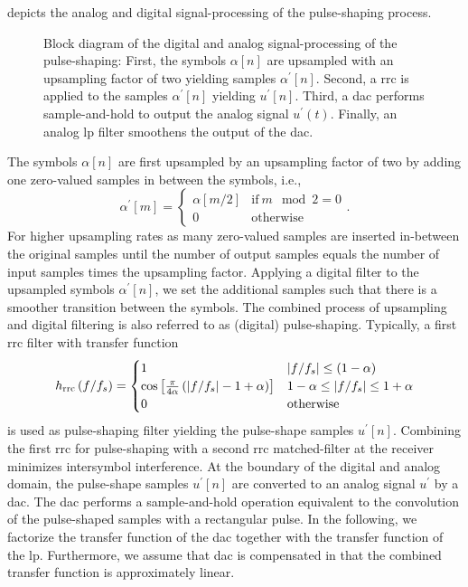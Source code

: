  depicts the analog and digital signal-processing of the pulse-shaping process.
\begin{figure}[htb]
	\centering
	
	\caption{Block diagram of the digital and analog signal-processing of the pulse-shaping: First, the symbols $\alpha[n]$ are upsampled with an upsampling factor of two yielding samples $\alpha^\prime[n]$. Second, a \gls{rrc} is applied to the samples $\alpha^\prime[n]$ yielding $u^\prime[n]$. Third, a \gls{dac} performs sample-and-hold to output the analog signal $u^\prime(t)$. Finally, an analog \gls{lp} filter smoothens the output of the \gls{dac}.}\label{fig:pulse_shaping_block}
\end{figure}
The symbols $\alpha[n]$ are first upsampled by an upsampling factor of two by adding one zero-valued samples in between the symbols, i.e.,
\begin{equation}
	\alpha^\prime[m]
	=
	\begin{cases}
		\alpha[m/2] & \text{if}\ m\mod2=0 \\
		0 & \text{otherwise}
	\end{cases}
	.
\end{equation}
For higher upsampling rates as many zero-valued samples are inserted in-between the original samples until the number of output samples equals the number of input samples times the upsampling factor.
Applying a digital filter to the upsampled symbols $\alpha^\prime[n]$, we set the additional samples such that there is a smoother transition between the symbols.
The combined process of upsampling and digital filtering is also referred to as (digital) pulse-shaping.
Typically, a first \gls{rrc} filter with transfer function~\cite[p.~33]{Nossek2015}
\begin{equation}
	h_\text{rrc}\left(f/f_s\right)
	=
	\begin{cases}
		1 & \abs{f/f_s}\leq(1-\alpha) \\
		\cos\left[\frac{\pi}{4\alpha}\left(\abs{f/f_s}-1+\alpha\right)\right] & 1-\alpha\leq\abs{f/f_s}\leq1+\alpha \\
		0 & \text{otherwise}
	\end{cases}
\end{equation}
is used as pulse-shaping filter yielding the pulse-shape samples $u^\prime[n]$.
Combining the first \gls{rrc} for pulse-shaping with a second \gls{rrc} matched-filter at the receiver minimizes intersymbol interference.
At the boundary of the digital and analog domain, the pulse-shape samples $u^\prime[n]$ are converted to an analog signal $u^\prime$ by a \gls{dac}.
The \gls{dac} performs a sample-and-hold operation equivalent to the convolution of the pulse-shaped samples with a rectangular pulse.
In the following, we factorize the transfer function of the \gls{dac} together with the transfer function of the \gls{lp}.
Furthermore, we assume that \gls{dac} is compensated in that the combined transfer function is approximately linear.

